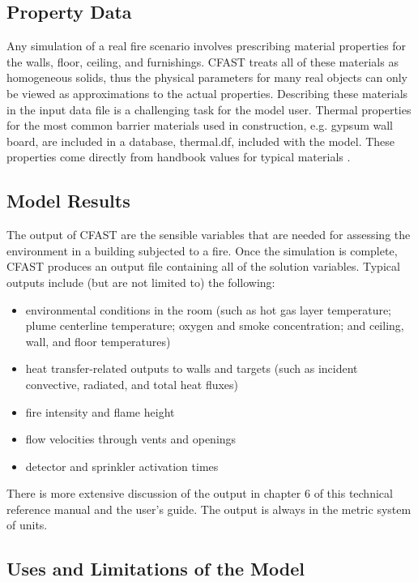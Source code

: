 \subsection{Property Data}

Any simulation of a real fire scenario involves prescribing material properties for the walls,
floor, ceiling, and furnishings. CFAST treats all of these materials as homogeneous solids, thus
the physical parameters for many real objects can only be viewed as approximations to the actual
properties. Describing these materials in the input data file is a challenging task for the model
user. Thermal properties for the most common barrier materials used in construction, e.g.
gypsum wall board, are included in a database, thermal.df, included with the model. These
properties come directly from handbook values for typical materials \cite{Incorpera:1981}.

\subsection{Model Results}

The output of CFAST are the sensible variables that are needed for assessing the environment in a building subjected to a fire. Once the simulation is complete, CFAST produces an output file containing all of the solution variables.  Typical outputs include (but are not limited to) the following:
\begin{itemize}
\item environmental conditions in the room (such as hot gas layer temperature; plume centerline temperature; oxygen and smoke concentration; and ceiling, wall, and floor temperatures)
\item heat transfer-related outputs to walls and targets (such as incident convective, radiated, and total heat fluxes)
\item fire intensity and flame height
\item flow velocities through vents and openings
\item detector and sprinkler activation times
\end{itemize}
There is more extensive discussion of the output in chapter 6 of this technical reference manual and the user's guide. The output is always in the metric system of units.

\subsection{Uses and Limitations of the Model} \label{sec:limitssummary}

